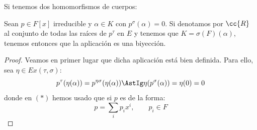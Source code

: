 \begin{prop}
    Si tenemos dos homomorfismos de cuerpos:
    \begin{figure}[H]
        \centering
    \end{figure}
    \noindent
    Sean $p\in F[x]$ irreducible y $\alpha\in K$ con $p^{\sigma}(\alpha)=0$. Si denotamos por $\cc{R}$ al conjunto de todas las raíces de $p^\tau$ en $E$ y tenemos que $K = \sigma(F)(\alpha)$, tenemos entonces que la aplicación
    es una biyección.
    \begin{proof}
        Veamos en primer lugar que dicha aplicación está bien definida. Para ello, sea $\eta \in Ex(\tau, \sigma)$:
        \begin{equation*}
            p^\tau(\eta(\alpha)) = p^{\eta \sigma}(\eta (\alpha)) \AstIg \eta(p^\sigma(\alpha)) = \eta(0) = 0
        \end{equation*}
        donde en $(\ast)$ hemos usado que si $p$ es de la forma:
        \begin{equation*}
            p = \sum_i p_i x^i, \qquad p_i \in F
        \end{equation*}


\end{proof}
\end{prop}
